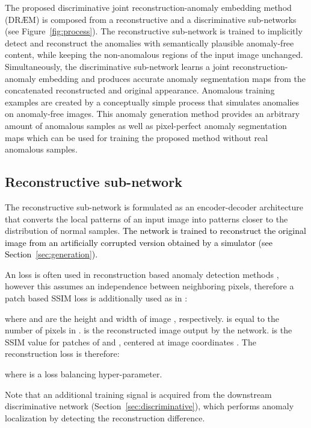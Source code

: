 \documentclass[10pt,twocolumn,letterpaper]{article}
\newcommand\ntext[1]{\textcolor{black}{#1}}
\begin{document}
The proposed discriminative joint reconstruction-anomaly embedding method (DR{\AE}M) is composed from a reconstructive and a discriminative sub-networks (see Figure~\ref{fig:process}). The reconstructive sub-network is trained to implicitly detect and reconstruct the anomalies with semantically plausible anomaly-free content, while keeping the non-anomalous regions of the input image unchanged.
Simultaneously, the discriminative sub-network learns a joint reconstruction-anomaly embedding and produces accurate anomaly segmentation maps from the concatenated reconstructed and original appearance. Anomalous training examples are created by a conceptually simple process that simulates anomalies on anomaly-free images. This anomaly generation method provides an arbitrary amount of anomalous samples as well as pixel-perfect anomaly segmentation maps which can be used for training the proposed method without real anomalous samples. 


\subsection{Reconstructive sub-network}

The reconstructive sub-network is formulated as an encoder-decoder architecture that converts the local patterns of an input image into patterns closer to the distribution of normal samples. 
\ntext{The network is trained to reconstruct the original image  from an artificially corrupted version  obtained by a simulator (see Section~\ref{sec:generation}).} 
 


An  loss is often used in reconstruction based anomaly detection methods \cite{akcay2018ganomaly, akccay2019skip}, however this assumes an independence between neighboring pixels, therefore a patch based SSIM \cite{wang2004image} loss is additionally used as in \cite{bergmann2018improving, zavrtanik2020riad}:

where  and  are the height and width of image , respectively.  is equal to the number of pixels in .  is the reconstructed image output by the network.  is the SSIM value for patches of  and , centered at image coordinates . The reconstruction loss is therefore:

where  is a loss balancing hyper-parameter.

Note that an additional training signal is acquired from the downstream discriminative network (Section~\ref{sec:discriminative}), which performs anomaly localization by detecting the reconstruction difference. 
\end{document}
